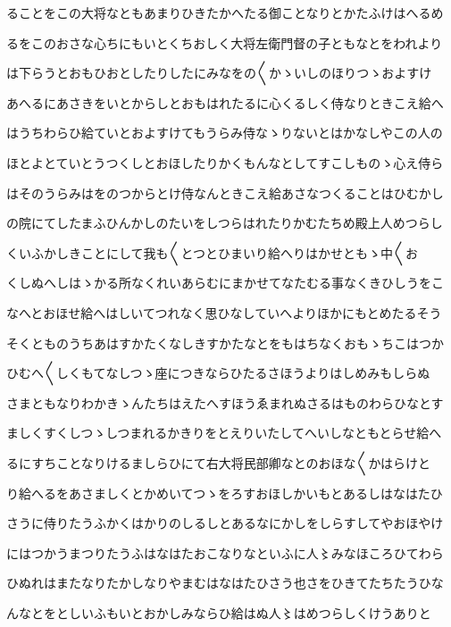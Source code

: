 \documentclass[a4paper,11pt,landscape]{ltjtarticle}
\begin{document}
\par\medskip
ることをこの大将なともあまりひきたかへたる御ことなりとかたふけはへるめ
\par\medskip
るをこのおさな心ちにもいとくちおしく大将左衛門督の子ともなとをわれより
\par\medskip
は下らうとおもひおとしたりしたにみなをの〱かゝいしのほりつゝおよすけ
\par\medskip
あへるにあさきをいとからしとおもはれたるに心くるしく侍なりときこえ給へ
\par\medskip
はうちわらひ給ていとおよすけてもうらみ侍なゝりないとはかなしやこの人の
\par\medskip
ほとよとていとうつくしとおほしたりかくもんなとしてすこしものゝ心え侍ら
\par\medskip
はそのうらみはをのつからとけ侍なんときこえ給あさなつくることはひむかし
\par\medskip
の院にてしたまふひんかしのたいをしつらはれたりかむたちめ殿上人めつらし
\par\medskip
くいふかしきことにして我も〱とつとひまいり給へりはかせともゝ中〱お
\par\medskip
くしぬへしはゝかる所なくれいあらむにまかせてなたむる事なくきひしうをこ
\par\medskip
なへとおほせ給へはしいてつれなく思ひなしていへよりほかにもとめたるそう
\par\medskip
そくとものうちあはすかたくなしきすかたなとをもはちなくおもゝちこはつか
\par\medskip
ひむへ〱しくもてなしつゝ座につきならひたるさほうよりはしめみもしらぬ
\par\medskip
さまともなりわかきゝんたちはえたへすほうゑまれぬさるはものわらひなとす
\par\medskip
ましくすくしつゝしつまれるかきりをとえりいたしてへいしなともとらせ給へ
\par\medskip
るにすちことなりけるましらひにて右大将民部卿なとのおほな〱かはらけと
\par\medskip
り給へるをあさましくとかめいてつゝをろすおほしかいもとあるしはなはたひ
\par\medskip
さうに侍りたうふかくはかりのしるしとあるなにかしをしらすしてやおほやけ
\par\medskip
にはつかうまつりたうふはなはたおこなりなといふに人〻みなほころひてわら
\par\medskip
ひぬれはまたなりたかしなりやまむはなはたひさう也さをひきてたちたうひな
\par\medskip
んなとをとしいふもいとおかしみならひ給はぬ人〻はめつらしくけうありと
\par\medskip
\end{document}

